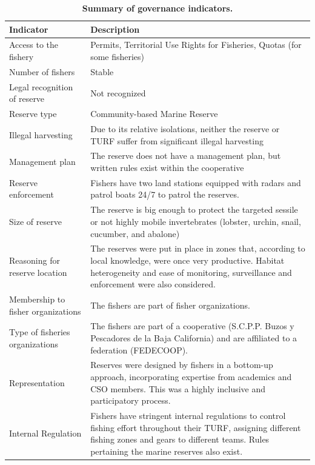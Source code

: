 \documentclass[10pt,letterpaper]{article}
\begin{document}
\begin{table}[!ht]
\begin{adjustwidth}{-2.25in}{0in} %
\centering
\caption{
{\bf Summary of governance indicators.}}
\begin{tabular}{l|>{\raggedright\arraybackslash}p{9cm}}
\hline
\bfseries{Indicator} & \bfseries{Description}\\
\hline
Access to the fishery & Permits, Territorial Use Rights for Fisheries, Quotas (for some fisheries)\\
\hline
Number of fishers & Stable\\
\hline
Legal recognition of reserve & Not recognized\\
\hline
Reserve type & Community-based Marine Reserve\\
\hline
Illegal harvesting & Due to its relative isolations, neither the reserve or TURF suffer from significant illegal harvesting\\
\hline
Management plan & The reserve does not have a management plan, but written rules exist within the cooperative\\
\hline
Reserve enforcement & Fishers have two land stations equipped with radars and patrol boats 24/7 to patrol the reserves.\\
\hline
Size of reserve & The reserve is big enough to protect the targeted sessile or not highly mobile invertebrates (lobster, urchin, snail, cucumber, and abalone)\\
\hline
Reasoning for reserve location & The reserves were put in place in zones that, according to local knowledge, were once very productive. Habitat heterogeneity and ease of monitoring, surveillance and enforcement were also considered.\\
\hline
Membership to fisher organizations & The fishers are part of fisher organizations.\\
\hline
Type of fisheries organizations & The fishers are part of a cooperative (S.C.P.P. Buzos y Pescadores de la Baja California) and are affiliated to a federation (FEDECOOP).\\
\hline
Representation & Reserves were designed by fishers in a bottom-up approach, incorporating expertise from academics and CSO members. This was a highly inclusive and participatory process.\\
\hline
Internal Regulation & Fishers have stringent internal regulations to control fishing effort throughout their TURF, assigning different fishing zones and gears to different teams. Rules pertaining the marine reserves also exist.\\

\end{tabular}
\end{adjustwidth}
\end{table}
\end{document}
